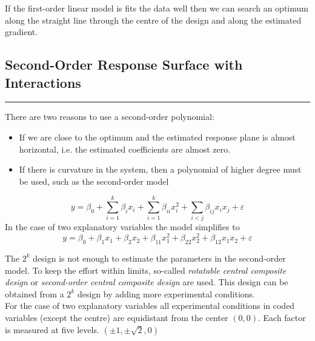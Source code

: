 If the first-order linear model is fits the data well then we can search an optimum along the straight line through the centre of the design and along the estimated gradient.

\subsection{Second-Order Response Surface with Interactions}
\noindent\rule[\linienAbstand]{\linewidth}{\linienDicke}
There are two reasons to use a second-order polynomial:\\
\begin{itemize}
  \item If we are close to the optimum and the estimated response plane is almost horizontal, i.e. the estimated coefficients are almost zero.\\
  \item If there is curvature in the system, then a polynomial of higher degree must be used, such as the second-order model
\end{itemize}
\begin{equation}
  y = \beta_0 + \sum_{i=1}^k \beta_i x_i + \sum_{i=1}^k \beta_{ii} x_i^2 + \sum_{i<j} \beta_{ij} x_i x_j + \varepsilon
\end{equation}
In the case of two explanatory variables the model simplifies to
\begin{equation}
  y = \beta_0 + \beta_1 x_1 + \beta_2 x_2 + \beta_{11} x_{1}^2 + \beta_{22}x_{2}^2 + \beta_{12} x_1 x_2 + \varepsilon
\end{equation}

The $2^k$ design is not enough to estimate the parameters in the second-order model. To keep the effort within limits, so-called \emph{rotatable central composite design} or \emph{second-order central composite design} are used. This design can be obtained from a $2^k$ design by adding more experimental conditions.\\
For the case of two explanatory variables all experimental conditions in coded variables (except the centre) are equidistant from the center $(0, 0)$. Each factor is measured at five levels. $(\pm 1, \pm \sqrt{2}, 0)$\\

